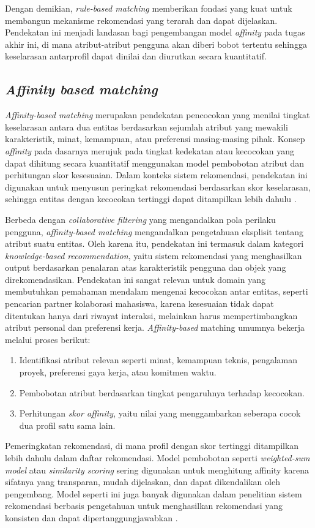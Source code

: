 Dengan demikian, \textit{rule-based matching} memberikan fondasi yang kuat untuk membangun mekanisme rekomendasi yang terarah dan dapat dijelaskan. Pendekatan ini menjadi landasan bagi pengembangan model \textit{affinity} pada tugas akhir ini, di mana atribut-atribut pengguna akan diberi bobot tertentu sehingga keselarasan antarprofil dapat dinilai dan diurutkan secara kuantitatif.

\subsection{\textit{Affinity based matching}}
\textit{Affinity-based matching} merupakan pendekatan pencocokan yang menilai tingkat keselarasan antara dua entitas berdasarkan sejumlah atribut yang mewakili karakteristik, minat, kemampuan, atau preferensi masing-masing pihak. Konsep \textit{affinity} pada dasarnya merujuk pada tingkat kedekatan atau kecocokan yang dapat dihitung secara kuantitatif menggunakan model pembobotan atribut dan perhitungan skor kesesuaian. Dalam konteks sistem rekomendasi, pendekatan ini digunakan untuk menyusun peringkat rekomendasi berdasarkan skor keselarasan, sehingga entitas dengan kecocokan tertinggi dapat ditampilkan lebih dahulu \textcite{burkeKnowledgebasedRecommenderSystems}.

Berbeda dengan \textit{collaborative filtering} yang mengandalkan pola perilaku pengguna, \textit{affinity-based matching} mengandalkan pengetahuan eksplisit tentang atribut suatu entitas. Oleh karena itu, pendekatan ini termasuk dalam kategori \textit{knowledge-based recommendation}, yaitu sistem rekomendasi yang menghasilkan output berdasarkan penalaran atas karakteristik pengguna dan objek yang direkomendasikan. Pendekatan ini sangat relevan untuk domain yang membutuhkan pemahaman mendalam mengenai kecocokan antar entitas, seperti pencarian partner kolaborasi mahasiswa, karena kesesuaian tidak dapat ditentukan hanya dari riwayat interaksi, melainkan harus mempertimbangkan atribut personal dan preferensi kerja. \textit{Affinity-based} matching umumnya bekerja melalui proses berikut:
\begin{enumerate}
\item {Identifikasi atribut relevan seperti minat, kemampuan teknis, pengalaman proyek, preferensi gaya kerja, atau komitmen waktu.} 
\item {Pembobotan atribut berdasarkan tingkat pengaruhnya terhadap kecocokan.}
\item {Perhitungan \textit{skor affinity}, yaitu nilai yang menggambarkan seberapa cocok dua profil satu sama lain.}
\end{enumerate}
Pemeringkatan rekomendasi, di mana profil dengan skor tertinggi ditampilkan lebih dahulu dalam daftar rekomendasi. Model pembobotan seperti \textit{weighted-sum model} atau \textit{similarity scoring} sering digunakan untuk menghitung affinity karena sifatnya yang transparan, mudah dijelaskan, dan dapat dikendalikan oleh pengembang. Model seperti ini juga banyak digunakan dalam penelitian sistem rekomendasi berbasis pengetahuan untuk menghasilkan rekomendasi yang konsisten dan dapat dipertanggungjawabkan \textcite{adomaviciusNextGenerationRecommender2005}.

